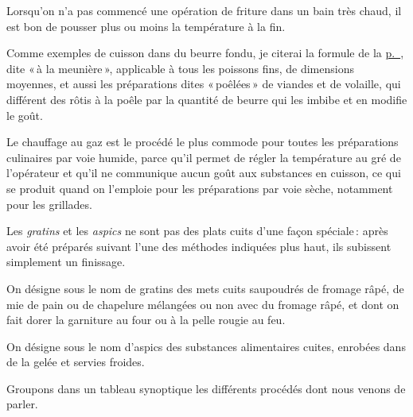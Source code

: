 Lorsqu'on n'a pas commencé une opération de friture dans un bain très chaud, il
est bon de pousser plus ou moins la température à la fin.


Comme exemples de cuisson dans du beurre fondu, je citerai la formule de la
\hyperlink{p0332}{p. \pageref{pg0332}}, dite « à la meunière », applicable à tous
les poissons fins, de dimensions moyennes, et aussi les préparations dites
« poêlées » de viandes et de volaille, qui différent des rôtis à la poêle par
la quantité de beurre qui les imbibe et en modifie le goût.

Le chauffage au gaz est le procédé le plus commode pour toutes les préparations
culinaires par voie humide, parce qu'il permet de régler la température au gré
de l'opérateur et qu'il ne communique aucun goût aux substances en cuisson, ce
qui se produit quand on l’emploie pour les préparations par voie sèche,
notamment pour les grillades.

\sk

Les \textit{gratins} et les \textit{aspics} ne sont pas des plats cuits d’une
façon spéciale : après avoir été préparés suivant l'une des méthodes indiquées
plus haut, ils subissent simplement un finissage.

On désigne sous le nom de gratins des mets cuits saupoudrés de fromage râpé,
de mie de pain ou de chapelure mélangées ou non avec du fromage râpé, et dont
on fait dorer la garniture au four ou à la pelle rougie au feu.

On désigne sous le nom d’aspics des substances alimentaires cuites, enrobées
dans de la gelée et servies froides.

\medskip

Groupons dans un tableau synoptique les différents procédés dont nous venons de
parler.

\sk

